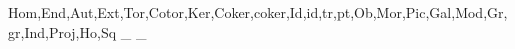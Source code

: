 \NewDocumentCommand \Aff {} {} %
\NewDocumentCommand \Vect {} {} %
\createbunch{\ensuremath\fun}
	{Hom,End,Aut,Ext,Tor,Cotor,Ker,Coker,coker,Id,id,tr,pt,Ob,Mor,Pic,Gal,Mod,Gr,gr,Ind,Proj,Ho,Sq} %
\NewDocumentCommand \zero {} 
	{} %
\NewDocumentCommand \one {} 
	{} %
\NewDocumentCommand \vac {} 
	{} %
\NewDocumentCommand \Gm {} 
	{_{}} %
\NewDocumentCommand \Ga {} 
	{_{}} %
\NewDocumentCommand \Dedekind {} 
	{} %
\NewDocumentCommand \dedekind {} 
	{{\scriptstyle\Dedekind}} %
\NewDocumentCommand \Osheaf {} 
	{} %
\NewDocumentCommand \bigO {} 
	{} %
\NewDocumentCommand{}
% 